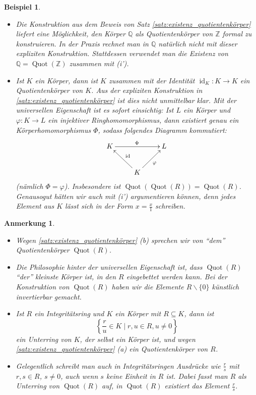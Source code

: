 \documentclass[a4paper, twoside, 11pt, ngerman]{report}
\newcommand{\QQ}{\mathds Q}
\newcommand{\ZZ}{\mathds Z}
\renewcommand{\setminus}{\smallsetminus}
\DeclareMathOperator{\Quot}{Quot}
\theoremstyle{definistyle}
\newtheorem{anm}[satz]{Anmerkung}
\newtheorem{bsp}[satz]{Beispiel}
\theoremstyle{remark}
\begin{document}
\begin{bsp}\label{bsp:quotient_koerper_konstruktion}
\begin{itemize}
    \item[(a)] Die Konstruktion aus dem Beweis von Satz \ref{satz:existenz_quotientenkörper} liefert eine Möglichkeit, den Körper $\QQ$ als Quotientenkörper von $\ZZ$ formal zu konstruieren.
    In der Praxis rechnet man in $\QQ$ natürlich nicht mit dieser expliziten Konstruktion. Stattdessen verwendet man die Existenz von $\QQ=\Quot(\ZZ)$ zusammen mit (i'). 
    \item[(b)] Ist $K$ ein Körper, dann ist $K$ zusammen mit der Identität $\operatorname{id}_K \colon K \to K$ ein Quotientenkörper von $K$. Aus der expliziten Konstruktion in \ref{satz:existenz_quotientenkörper} ist dies nicht unmittelbar klar.
    Mit der universellen Eigenschaft ist es sofort einsichtig: Ist $L$ ein Körper und $\varphi \colon K \to L$ ein injektiver Ringhomomorphismus, dann existiert genau ein Körperhomomorphismus $\Phi$, sodass folgendes Diagramm kommutiert:
\[
\begin{xy}
\xymatrix{
K \ar[rr]^{\Phi}  & & L \\
& \ar[ul]_{\operatorname{id}} K \ar[ur]_{\varphi} &
}
\end{xy}
\]
(nämlich $\Phi = \varphi$). Insbesondere ist $\Quot(\Quot(R))=\Quot(R)$. Genausogut hätten wir auch mit (i') argumentieren können, denn jedes Element aus $K$ lässt sich in der Form $x=\frac{x}{1}$ schreiben.
\end{itemize}
\end{bsp}

\begin{anm}\label{anm:quotient_koerper_besonderheiten}
\begin{itemize}
    \item Wegen \ref{satz:existenz_quotientenkörper} (b) sprechen wir von "`dem"' Quotientenkörper $\Quot(R)$.
    \item Die Philosophie hinter der universellen Eigenschaft ist, dass $\Quot(R)$ "`der"' kleinste Körper ist, in den $R$ eingebettet werden kann. Bei der Konstruktion von $\Quot(R)$ haben wir die Elemente $R \setminus \{0\}$ künstlich invertierbar gemacht.
    \item Ist $R$ ein Integritätsring und $K$ ein Körper mit $R \subseteq K$, dann ist
    \[
    \left\{ \frac{r}{u} \in K \mid r, u \in R, u \neq 0 \right\}
    \]
    ein Unterring von $K$, der selbst ein Körper ist, und wegen \ref{satz:existenz_quotientenkörper} (a) ein Quotientenkörper von $R$.
    \item Gelegentlich schreibt man auch in Integritätsringen Ausdrücke wie $\frac{r}{s}$ mit $r, s \in R$, $s \neq 0$, auch wenn $s$ keine Einheit in $R$ ist. Dabei fasst man $R$ als Unterring von $\Quot(R)$ auf, in $\Quot(R)$ existiert das Element $\frac{r}{s}$.
\end{itemize}
\end{anm}
\end{document}
